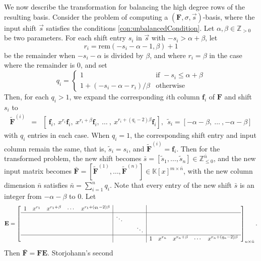 We now describe the transformation for balancing the high degree rows
of the resulting basis. Consider the problem of computing a $\left(\mathbf{F},\sigma,\vec{s}\right)$-basis,
where the input shift $\vec{s}$ satisfies the conditions \eqref{con:unbalancedCondition}.
Let $\alpha,\beta\in\mathbb{Z}_{>0}$ be two parameters. For each
shift entry $s_{i}$ in $\vec{s}$ with $-s_{i}>\alpha+\beta$, let
\[
r_{i}=\mbox{rem}\left(-s_{i}-\alpha-1,\beta\right)+1\]
 be the remainder when $-s_{i}-\alpha$ is divided by $\beta$, and
where $r_{i}=\beta$ in the case where the remainder is $0$, and
set \[
q_{i}=\begin{cases}
1 & \mbox{if }-s_{i}\le\alpha+\beta\\
1+\left(-s_{i}-\alpha-r_{i}\right)/\beta & \mbox{otherwise}\end{cases}\]
 Then, for each $q_{i}>1$, we expand the corresponding $i$th column
$\mathbf{f}_{i}$ of $\mathbf{F}$ and shift $s_{i}$ to \begin{eqnarray*}
\tilde{\mathbf{F}}^{\left(i\right)} & = & \left[~\mathbf{f}_{i},~x^{r_{i}}\mathbf{f}_{i},~x^{r_{i}+\beta}\mathbf{f}_{i},~\dots~,~x^{r_{i}+(q_{i}-2)\beta}\mathbf{f}_{i}\right],~~\tilde{s}_{i}=\left[-\alpha-\beta,~\dots~,-\alpha-\beta\right]\end{eqnarray*}
 with $q_{i}$ entries in each case. When $q_{i}=1$, the corresponding
shift entry and input column remain the same, that is, $\tilde{s}_{i}=s_{i}$,
and $\tilde{\mathbf{F}}^{\left(i\right)}=\mathbf{f}_{i}$. Then for
the transformed problem, the new shift becomes $\bar{s}=[\tilde{s}_{1},\dots,\tilde{s}_{n}]\in\mathbb{Z}_{\le0}^{\bar{n}}$,
and the new input matrix becomes $\bar{\mathbf{F}}=[\tilde{\mathbf{F}}^{\left(1\right)},\dots,\tilde{\mathbf{F}}^{\left(n\right)}]\in\mathbb{K}\left[x\right]^{m\times\bar{n}}$,
with the new column dimension $\bar{n}$ satisfies $\bar{n}=\sum_{i=1}^{n}q_{i}$.
Note that every entry of the new shift $\bar{s}$ is an integer from
$-\alpha-\beta$ to $0$. Let \[
\mathbf{E}=\left[\begin{array}{ccccc|ccc|ccccccc}
1 & x^{r_{1}} & x^{r_{1}+\beta} & \cdots & x^{r_{1}+(q_{1}-2)\beta} &  &  & \\
\hline  &  &  &  &  & \ddots &  & \\
 &  &  &  &  &  & \  & \ddots\\
\hline  &  &  &  &  &  &  &  & 1 & x^{r_{n}} & x^{r_{n}+\beta} & \cdots & x^{r_{n}+(q_{n}-2)\beta}\end{array}\right]_{n\times\bar{n}}.\]
 Then $\bar{\mathbf{F}}=\mathbf{F}\mathbf{E}$. Storjohann's second
